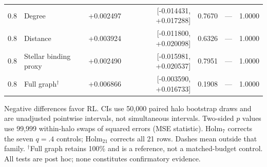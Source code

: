 \begin{table}[t]
\begin{tabular}{rllrrrr}
0.8 & Degree & +0.002497 & [-0.014431, +0.017288] & 0.7670 & --- & 1.0000 \\
0.8 & Distance & +0.003924 & [-0.011800, +0.020098] & 0.6326 & --- & 1.0000 \\
0.8 & Stellar binding proxy & +0.002490 & [-0.015981, +0.020537] & 0.7951 & --- & 1.0000 \\
0.8 & Full graph$^\dagger$ & +0.006866 & [-0.003590, +0.016733] & 0.1908 & --- & 1.0000 \\
\bottomrule
\end{tabular}
\par\smallskip
\begin{minipage}{0.98\textwidth}
\footnotesize Negative differences favor RL. CIs use 50,000 paired halo bootstrap draws and are unadjusted pointwise intervals, not simultaneous intervals. Two-sided $p$ values use 99,999 within-halo swaps of squared errors (MSE statistic). Holm$_7$ corrects the seven $q=.4$ controls; Holm$_{21}$ corrects all 21 rows. Dashes mean outside that family. $^\dagger$Full graph retains 100\% and is a reference, not a matched-budget control. All tests are post hoc; none constitutes confirmatory evidence.
\end{minipage}
\end{table}
